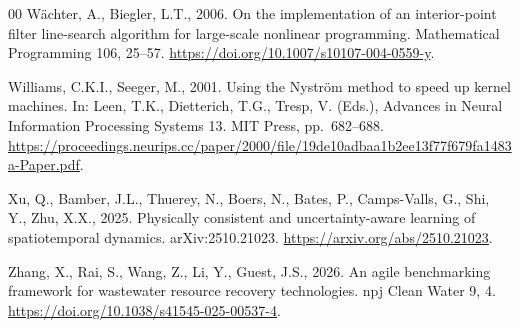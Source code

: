 \documentclass[a4paper,fleqn]{cas-sc}
\begin{document}
\begin{thebibliography}{00}
W\"achter, A., Biegler, L.T., 2006. On the implementation of an interior-point filter line-search algorithm for large-scale nonlinear programming. Mathematical Programming 106, 25--57. \url{https://doi.org/10.1007/s10107-004-0559-y}.

Williams, C.K.I., Seeger, M., 2001. Using the Nystr\"om method to speed up kernel machines. In: Leen, T.K., Dietterich, T.G., Tresp, V. (Eds.), Advances in Neural Information Processing Systems 13. MIT Press, pp.~682--688. \url{https://proceedings.neurips.cc/paper/2000/file/19de10adbaa1b2ee13f77f679fa1483a-Paper.pdf}.

Xu, Q., Bamber, J.L., Thuerey, N., Boers, N., Bates, P., Camps-Valls, G., Shi, Y., Zhu, X.X., 2025. Physically consistent and uncertainty-aware learning of spatiotemporal dynamics. arXiv:2510.21023. \url{https://arxiv.org/abs/2510.21023}.

Zhang, X., Rai, S., Wang, Z., Li, Y., Guest, J.S., 2026. An agile benchmarking framework for wastewater resource recovery technologies. npj Clean Water 9, 4. \url{https://doi.org/10.1038/s41545-025-00537-4}.
\end{thebibliography}
\end{document}
